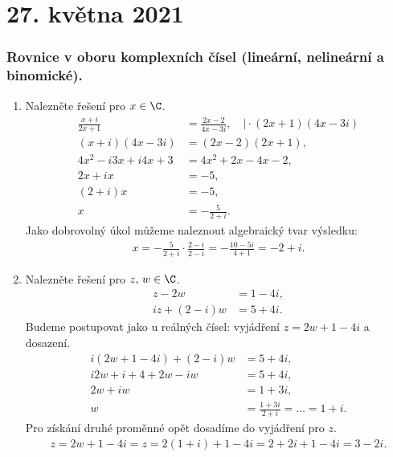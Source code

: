 \documentclass[11pt,a4paper]{article}
\begin{document}
    \section*{27. května 2021}

        \subsubsection*{Rovnice v oboru komplexních čísel (lineární, nelineární a binomické).}

        \begin{enumerate}

            \item Nalezněte řešení pro $x \in \C$. \begin{align*}
                \frac{x+i}{2x+1} &= \frac{2x-2}{4x-3i}, \quad \Big| \cdot (2x+1)(4x-3i)
            \\
                (x+i)(4x-3i) &= (2x-2)(2x+1),
            \\
                4x^2 - i3x + i4x + 3 &= 4x^2 + 2x - 4x - 2,
            \\
                2x + ix &= -5,
            \\
                (2+i)x &= -5,
            \\
                x &= -\frac{5}{2+i}.
            \end{align*}
            Jako dobrovolný úkol můžeme naleznout algebraický tvar výsledku:
            \begin{align*}
                x = -\frac{5}{2+i} \cdot \frac{2-i}{2-i} = -\frac{10-5i}{4+1} = -2 + i.
            \end{align*}

            \item Nalezněte řešení pro $z, \, w \in \C$. \begin{align*}
                z - 2w &= 1 - 4i,
            \\
                iz + (2-i)w &= 5 + 4i.
            \end{align*}
            Budeme postupovat jako u reálných čísel: vyjádření $z = 2w + 1 - 4i$ a dosazení.
            \begin{align*}
                i(2w + 1 - 4i) + (2-i)w &= 5 + 4i,
            \\
                i2w + i + 4 + 2w - iw &= 5 + 4i,
            \\
                2w + iw &= 1 + 3i,
            \\
                w &= \frac{1+3i}{2+i} = \dots = 1+i.
            \end{align*}
            Pro získání druhé proměnné opět dosadíme do vyjádření pro $z$.
            \begin{align*}
                z = 2w + 1 - 4i = z = 2(1+i) + 1 - 4i = 2 + 2i + 1 - 4i = 3 - 2i.
            \end{align*}


\end{enumerate}
\end{document}
